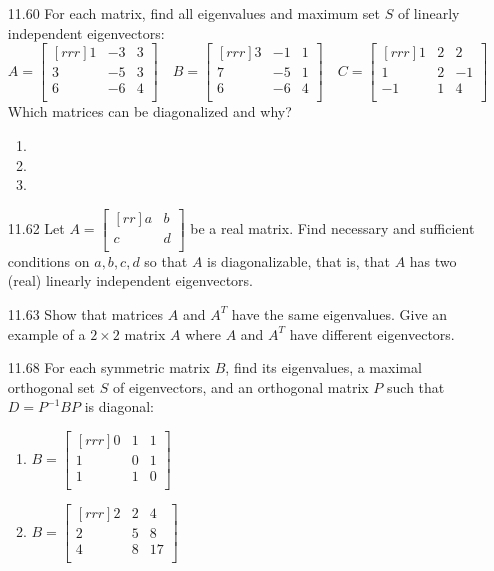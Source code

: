 \documentclass[12pt]{article}
\theoremstyle{definition}
\theoremstyle{plain}
\begin{document}
\begin{enumerate}
\item[11.60]For each matrix, find all eigenvalues and maximum set $S$ of linearly independent eigenvectors:
	\[ A=\begin{bmatrix}[rrr]1&-3&3\\3&-5&3\\6&-6&4\\\end{bmatrix} \quad B=\begin{bmatrix}[rrr]3&-1&1\\7&-5&1\\6&-6&4\\\end{bmatrix} \quad  C=\begin{bmatrix}[rrr]1&2&2\\1&2&-1\\-1&1&4\\\end{bmatrix} \]
	Which matrices can be diagonalized and why?
	\begin{enumerate}
	\item 
	\item 
	\item 
	\end{enumerate}
\item[11.62]Let $A=\begin{bmatrix}[rr]a&b\\c&d\\\end{bmatrix}$ be a real matrix. Find necessary and sufficient conditions on $a,b,c,d$ so that $A$ is diagonalizable, that is, that $A$ has two (real) linearly independent eigenvectors.
\item[11.63]Show that matrices $A$ and $A^T$ have the same eigenvalues. Give an example of a $2 \times 2$ matrix $A$ where $A$ and $A^T$ have different eigenvectors.
\item[11.68]For each symmetric matrix $B$, find its eigenvalues, a maximal orthogonal set $S$ of eigenvectors, and an orthogonal matrix $P$ such that $D=P^{-1}BP$ is diagonal:
	\begin{enumerate}
	\item $B=\begin{bmatrix}[rrr]0&1&1\\1&0&1\\1&1&0\\\end{bmatrix}$
	\item $B=\begin{bmatrix}[rrr]2&2&4\\2&5&8\\4&8&17\\\end{bmatrix}$

\end{enumerate}
\end{enumerate}
\end{document}
